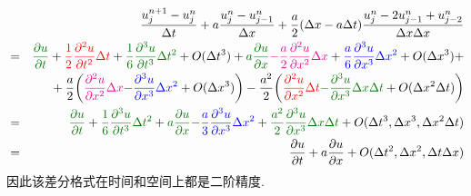 \begin{solution}
\begin{eqnarray*}
 &  & \frac{u_{j}^{n+1}-u_{j}^{n}}{\Delta t}+a\frac{u_{j}^{n}-u_{j-1}^{n}}{\Delta x}+\frac{a}{2}(\Delta x-a\Delta t)\frac{u_{j}^{n}-2u_{j-1}^{n}+u_{j-2}^{n}}{\Delta x\Delta x}\\
 & = & \textcolor{DarkGreen}{\frac{\partial u}{\partial t}}+\textcolor{red}{\frac{1}{2}\frac{\partial^{2}u}{\partial t^{2}}\Delta t}+\textcolor{DarkGreen}{\frac{1}{6}\frac{\partial^{3}u}{\partial t^{3}}\Delta t^{2}}+O(\Delta t^{3})+\textcolor{DarkGreen}{a\frac{\partial u}{\partial x}}\textcolor{magenta}{-\frac{a}{2}\frac{\partial^{2}u}{\partial x^{2}}\Delta x}+
\textcolor{blue}{\frac{a}{6}\frac{\partial^{3}u}{\partial x^{3}}\Delta x^{2}}
 +O(\Delta x^{3})+\\
 &  & \hphantom{\frac{\partial u}{\partial t}}
 +\frac{a}{2}\bigg(\textcolor{magenta}{\frac{\partial^{2}u}{\partial x^{2}}\Delta x}\textcolor{blue}{-\frac{\partial^{3}u}{\partial x^{3}}\Delta x^{2}}+O(\Delta x^{3})\bigg)
 -\frac{a^2}{2}\bigg(\textcolor{red}{\frac{\partial^{2}u}{\partial x^{2}}\Delta t}\textcolor{DarkGreen}{-\frac{\partial^{3}u}{\partial x^{3}}\Delta x\Delta t}+O(\Delta x^{2}\Delta t)\bigg)\\
 & = & \textcolor{DarkGreen}{\frac{\partial u}{\partial t}}+\textcolor{DarkGreen}{\frac{1}{6}\frac{\partial^{3}u}{\partial t^{3}}\Delta t^{2}}+\textcolor{DarkGreen}{a\frac{\partial u}{\partial x}}\textcolor{blue}{-\frac{a}{3}\frac{\partial^{3}u}{\partial x^{3}}\Delta x^{2}}+\textcolor{DarkGreen}{\frac{a^{2}}{2}\frac{\partial^{3}u}{\partial x^{3}}\Delta x\Delta t}+O(\Delta t^{3},\Delta x^{3},\Delta x^{2}\Delta t)\\
 & = & \frac{\partial u}{\partial t}+a\frac{\partial u}{\partial x}+O(\Delta t^{2},\Delta x^{2},\Delta t\Delta x)
\end{eqnarray*}
因此该差分格式在时间和空间上都是二阶精度.


\end{solution}
